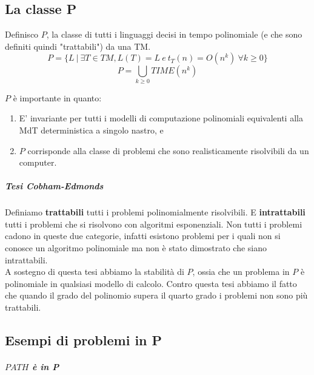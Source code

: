 \subsection{La classe P}
Definisco $P$, la classe di tutti i linguaggi decisi in tempo polinomiale (e che sono definiti quindi "trattabili") da una TM.
\[
	P = \{ L \ | \ \exists T \in TM, L(T) = L \ e \ t_{T}(n) = O(n^k) \  \forall k \geq 0 \}
\]
\[
	P = \bigcup_{k \geq 0} TIME(n^k)
\]

$P$ è importante in quanto:
\begin{enumerate}
\item E' invariante per tutti i modelli di computazione polinomiali equivalenti alla MdT deterministica a singolo nastro, e
\item $P$ corrisponde alla classe di problemi che sono realisticamente risolvibili da un computer.
\end{enumerate}
\subparagraph{Tesi Cobham-Edmonds} Definiamo \textbf{trattabili} tutti i problemi polinomialmente risolvibili. E \textbf{intrattabili} tutti i problemi che si risolvono con algoritmi esponenziali. Non tutti i problemi cadono in queste due categorie, infatti esistono problemi per i quali non si conosce un algoritmo polinomiale ma non è stato dimostrato che siano intrattabili.\\ A sostegno di questa tesi abbiamo la stabilità di $P$, ossia che un problema in $P$ è polinomiale in qualsiasi modello di calcolo. Contro questa tesi abbiamo il fatto che quando il grado del polinomio supera il quarto grado i problemi non sono più trattabili.
\subsection{Esempi di problemi in P}

\subparagraph{$PATH$ è in P} 

